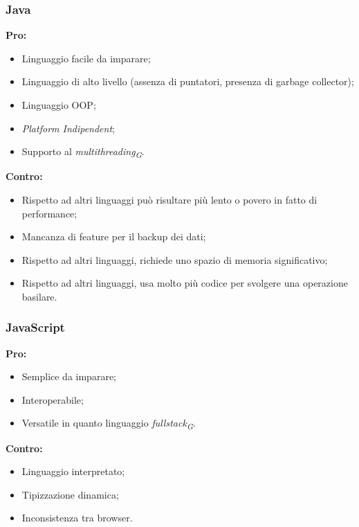 \documentclass[a4paper, 12pt]{article}
\begin{document}
\subsubsection{Java}
\textbf{Pro:}
\begin{itemize}
    \item Linguaggio facile da imparare;
    \item Linguaggio di alto livello (assenza di puntatori, presenza di garbage collector);
    \item Linguaggio OOP;
    \item \textit{Platform Indipendent};
    \item Supporto al \textit{multithreading\textsubscript{G}}. 
\end{itemize}
\vspace*{0.5cm}
\textbf{Contro:}
\begin{itemize}
    \item Rispetto ad altri linguaggi può risultare più lento o povero in fatto di performance;
    \item Mancanza di feature per il backup dei dati;
    \item Rispetto ad altri linguaggi, richiede uno spazio di memoria significativo;
    \item Rispetto ad altri linguaggi, usa molto più codice per svolgere una operazione basilare.
\end{itemize}
\subsubsection{JavaScript}
\textbf{Pro:}
\begin{itemize}
    \item Semplice da imparare;
    \item Interoperabile;
    \item Versatile in quanto linguaggio \textit{fullstack\textsubscript{G}}.
\end{itemize}
\vspace*{0.5cm}
\textbf{Contro:}
\begin{itemize}
    \item Linguaggio interpretato;
    \item Tipizzazione dinamica;
    \item Inconsistenza tra browser.
\end{itemize}
\end{document}
